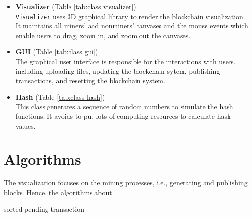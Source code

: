 \begin{itemize}
    \item \textbf{Visualizer} (Table \ref{tab:class visualizer}) \\
        \texttt{Visualizer} uses 3D graphical library to render the blockchain visualization. It maintains all miners' and nonminers' canvases and the mouse events which enable users to drag, zoom in, and zoom out the canvases.
    \item \textbf{GUI} (Table \ref{tab:class gui}) \\
        The graphical user interface is responsible for the interactions with users, including uploading files, updating the blockchain sytem, publishing transactions, and resetting the blockchain system.
    \item \textbf{Hash} (Table \ref{tab:class hash}) \\
        This class generates a sequence of random numbers to simulate the hash functions. It avoids to put lots of computing resources to calculate hash values.
\end{itemize}

\section{Algorithms}
\label{algorithms}

The visualization focuses on the mining processes, i.e., generating and publishing blocks. Hence, the algorithms about

sorted pending transaction

